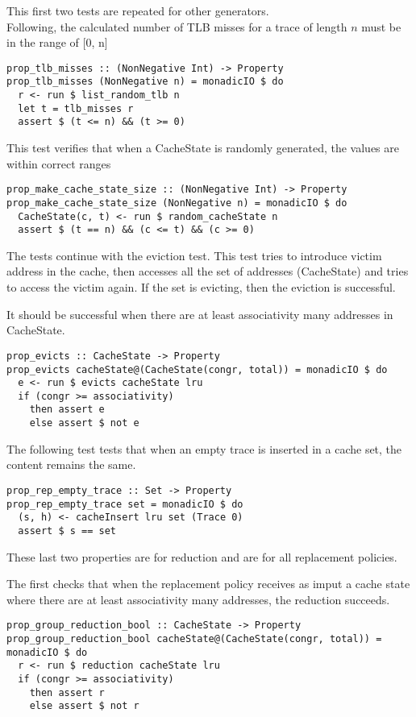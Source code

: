 \documentclass[11pt]{article}
\begin{document}
This first two tests are repeated for other generators.\\

Following, the calculated number of TLB misses for a trace of length $n$ must be in the range of [0, n]

\begin{verbatim}
prop_tlb_misses :: (NonNegative Int) -> Property
prop_tlb_misses (NonNegative n) = monadicIO $ do
  r <- run $ list_random_tlb n
  let t = tlb_misses r
  assert $ (t <= n) && (t >= 0)
\end{verbatim}

This test verifies that when a CacheState is randomly generated, the values are within correct ranges
\begin{verbatim}
prop_make_cache_state_size :: (NonNegative Int) -> Property
prop_make_cache_state_size (NonNegative n) = monadicIO $ do
  CacheState(c, t) <- run $ random_cacheState n
  assert $ (t == n) && (c <= t) && (c >= 0)
\end{verbatim}

The tests continue with the eviction test. This test tries to introduce victim address in the cache, then accesses all the set of addresses (CacheState) and tries to access the victim again. If the set is evicting, then the eviction is successful.

It should be successful when there are at least associativity many addresses in CacheState.
\begin{verbatim}
prop_evicts :: CacheState -> Property
prop_evicts cacheState@(CacheState(congr, total)) = monadicIO $ do
  e <- run $ evicts cacheState lru
  if (congr >= associativity)
    then assert e
    else assert $ not e  
\end{verbatim}

The following test tests that when an empty trace is inserted in a cache set, the content remains the same.
\begin{verbatim}
prop_rep_empty_trace :: Set -> Property
prop_rep_empty_trace set = monadicIO $ do
  (s, h) <- cacheInsert lru set (Trace 0)
  assert $ s == set
\end{verbatim}

These last two properties are for reduction and are for all replacement policies.

The first checks that when the replacement policy receives as imput a cache state where there are at least associativity many addresses, the reduction succeeds.

\begin{verbatim}
prop_group_reduction_bool :: CacheState -> Property
prop_group_reduction_bool cacheState@(CacheState(congr, total)) = monadicIO $ do
  r <- run $ reduction cacheState lru
  if (congr >= associativity)
    then assert r
    else assert $ not r
\end{verbatim}
\end{document}
